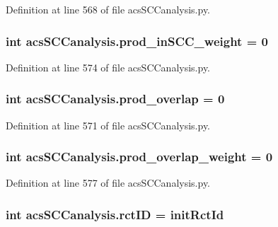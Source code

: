 Definition at line 568 of file acs\-S\-C\-Canalysis.\-py.

\hypertarget{a00096_aa22adccedd9ae548d0687df507ebd92d}{
\subsubsection[{prod\-\_\-in\-S\-C\-C\-\_\-weight}]{\setlength{\rightskip}{0pt plus 5cm}int acs\-S\-C\-Canalysis.\-prod\-\_\-in\-S\-C\-C\-\_\-weight = 0}}\label{a00096_aa22adccedd9ae548d0687df507ebd92d}


Definition at line 574 of file acs\-S\-C\-Canalysis.\-py.

\hypertarget{a00096_a213e964195f0666d00663ca874a09caa}{
\subsubsection[{prod\-\_\-overlap}]{\setlength{\rightskip}{0pt plus 5cm}int acs\-S\-C\-Canalysis.\-prod\-\_\-overlap = 0}}\label{a00096_a213e964195f0666d00663ca874a09caa}


Definition at line 571 of file acs\-S\-C\-Canalysis.\-py.

\hypertarget{a00096_ab78b07d6cd1a94356c4fee43dfc1272a}{
\subsubsection[{prod\-\_\-overlap\-\_\-weight}]{\setlength{\rightskip}{0pt plus 5cm}int acs\-S\-C\-Canalysis.\-prod\-\_\-overlap\-\_\-weight = 0}}\label{a00096_ab78b07d6cd1a94356c4fee43dfc1272a}


Definition at line 577 of file acs\-S\-C\-Canalysis.\-py.

\hypertarget{a00096_a78ffc7d3b69c53ec5389a151e7fdcb83}{
\subsubsection[{rct\-I\-D}]{\setlength{\rightskip}{0pt plus 5cm}int acs\-S\-C\-Canalysis.\-rct\-I\-D = {\bf init\-Rct\-Id}}}\label{a00096_a78ffc7d3b69c53ec5389a151e7fdcb83}


